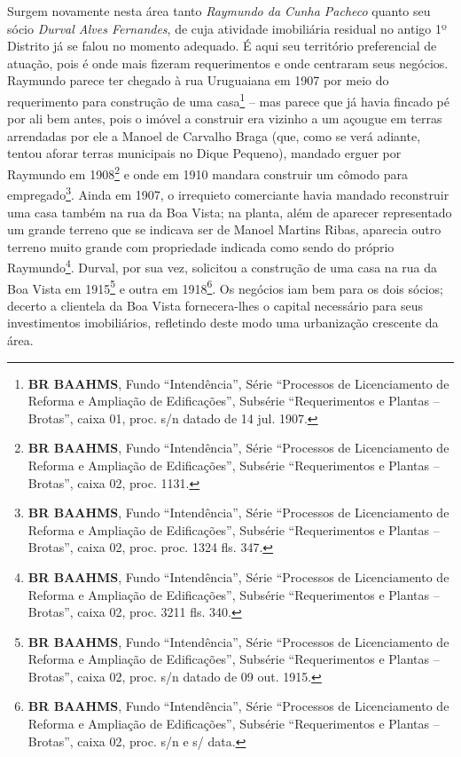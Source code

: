Surgem novamente nesta área tanto \textit{Raymundo da Cunha Pacheco} quanto seu sócio \textit{Durval Alves Fernandes}, de cuja atividade imobiliária residual no antigo 1º Distrito já se falou no momento adequado. É aqui seu território preferencial de atuação, pois é onde mais fizeram requerimentos e onde centraram seus negócios. Raymundo parece ter chegado à rua Uruguaiana em 1907 por meio do requerimento para construção de uma casa\footnote{\textbf{BR BAAHMS}, Fundo ``Intendência'', Série ``Processos de Licenciamento de Reforma e Ampliação de Edificações'', Subsérie ``Requerimentos e Plantas -- Brotas'', caixa 01, proc. s/n datado de 14 jul. 1907.} -- mas parece que já havia fincado pé por ali bem antes, pois o imóvel a construir era vizinho a um açougue em terras arrendadas por ele a Manoel de Carvalho Braga (que, como se verá adiante, tentou aforar terras municipais no Dique Pequeno), mandado erguer por Raymundo em 1908\footnote{\textbf{BR BAAHMS}, Fundo ``Intendência'', Série ``Processos de Licenciamento de Reforma e Ampliação de Edificações'', Subsérie ``Requerimentos e Plantas -- Brotas'', caixa 02, proc. 1131.} e onde em 1910 mandara construir um cômodo para empregado\footnote{\textbf{BR BAAHMS}, Fundo ``Intendência'', Série ``Processos de Licenciamento de Reforma e Ampliação de Edificações'', Subsérie ``Requerimentos e Plantas -- Brotas'', caixa 02, proc. proc. 1324 fls. 347.}. Ainda em 1907, o irrequieto comerciante havia mandado reconstruir uma casa também na rua da Boa Vista; na planta, além de aparecer representado um grande terreno que se indicava ser de Manoel Martins Ribas, aparecia outro terreno muito grande com propriedade indicada como sendo do próprio Raymundo\footnote{\textbf{BR BAAHMS}, Fundo ``Intendência'', Série ``Processos de Licenciamento de Reforma e Ampliação de Edificações'', Subsérie ``Requerimentos e Plantas -- Brotas'', caixa 02, proc. 3211 fls. 340.}. Durval, por sua vez, solicitou a construção de uma casa na rua da Boa Vista em 1915\footnote{\textbf{BR BAAHMS}, Fundo ``Intendência'', Série ``Processos de Licenciamento de Reforma e Ampliação de Edificações'', Subsérie ``Requerimentos e Plantas -- Brotas'', caixa 02, proc. s/n datado de 09 out. 1915.} e outra em 1918\footnote{\textbf{BR BAAHMS}, Fundo ``Intendência'', Série ``Processos de Licenciamento de Reforma e Ampliação de Edificações'', Subsérie ``Requerimentos e Plantas -- Brotas'', caixa 02, proc. s/n e s/ data.}. Os negócios iam bem para os dois sócios; decerto a clientela da Boa Vista fornecera-lhes o capital necessário para seus investimentos imobiliários, refletindo deste modo uma urbanização crescente da área. 

